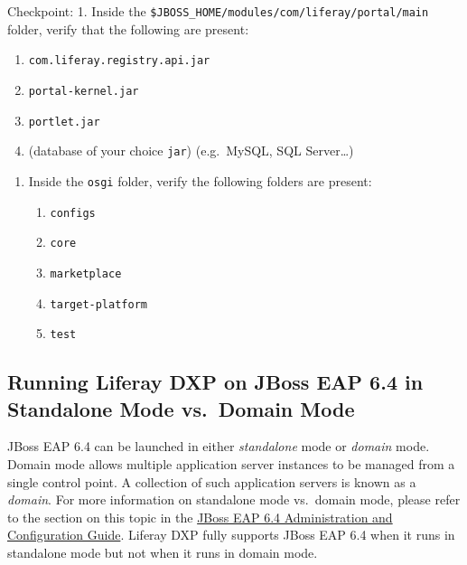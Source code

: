Checkpoint: 1. Inside the
\texttt{\$JBOSS\_HOME/modules/com/liferay/portal/main} folder, verify
that the following are present:

\begin{enumerate}
\def\labelenumi{\alph{enumi}.}
\tightlist
\item
  \texttt{com.liferay.registry.api.jar}
\item
  \texttt{portal-kernel.jar}
\item
  \texttt{portlet.jar}
\item
  (database of your choice \texttt{jar}) (e.g.~MySQL, SQL Server\ldots)
\end{enumerate}

\begin{enumerate}
\def\labelenumi{\arabic{enumi}.}
\setcounter{enumi}{1}
\item
  Inside the \texttt{osgi} folder, verify the following folders are
  present:

  \begin{enumerate}
  \def\labelenumii{\alph{enumii}.}
  \tightlist
  \item
    \texttt{configs}
  \item
    \texttt{core}
  \item
    \texttt{marketplace}
  \item
    \texttt{target-platform}
  \item
    \texttt{test}
  \end{enumerate}
\end{enumerate}

\subsection{Running Liferay DXP on JBoss EAP 6.4 in Standalone Mode
vs.~Domain
Mode}\label{running-liferay-dxp-on-jboss-eap-6.4-in-standalone-mode-vs.-domain-mode}

JBoss EAP 6.4 can be launched in either \emph{standalone} mode or
\emph{domain} mode. Domain mode allows multiple application server
instances to be managed from a single control point. A collection of
such application servers is known as a \emph{domain}. For more
information on standalone mode vs.~domain mode, please refer to the
section on this topic in the
\href{https://access.redhat.com/documentation/en-US/JBoss_Enterprise_Application_Platform/6.4/html/Administration_and_Configuration_Guide/About_JBoss_Enterprise_Application_Platform_6_Operating_Modes.html}{JBoss
EAP 6.4 Administration and Configuration Guide}. Liferay DXP fully
supports JBoss EAP 6.4 when it runs in standalone mode but not when it
runs in domain mode.


